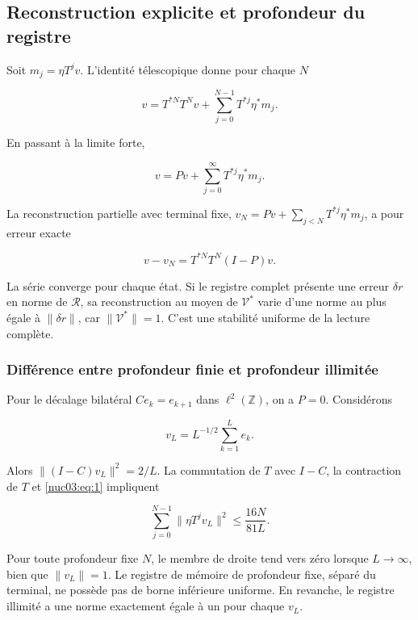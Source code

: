 \subsection{Reconstruction explicite et profondeur du registre}

Soit \(m_j=\eta T^jv\). L’identité télescopique donne pour chaque \(N\)

\begin{equation}
\boxed{v=T^{*N}T^Nv+\sum_{j=0}^{N-1}T^{*j}\eta^*m_j.}
\label{nuc03:eq:8}
\end{equation}

En passant à la limite forte,

\begin{equation}
\boxed{v=Pv+\sum_{j=0}^{\infty}T^{*j}\eta^*m_j.}
\label{nuc03:eq:9}
\end{equation}

La reconstruction partielle avec terminal fixe,
\(v_N=Pv+\sum_{j<N}T^{*j}\eta^*m_j\), a pour erreur exacte

\begin{equation}
v-v_N=T^{*N}T^N(I-P)v.
\label{nuc03:eq:10}
\end{equation}

La série converge pour chaque état. Si le registre complet présente une erreur \(\delta r\) en norme de \(\mathcal R\), sa reconstruction au moyen de \(\mathcal V^*\) varie d’une norme au plus égale à \(\|\delta r\|\), car \(\|\mathcal V^*\|=1\). C’est une stabilité uniforme de la lecture complète.

\subsubsection{Différence entre profondeur finie et profondeur illimitée}

Pour le décalage bilatéral \(Ce_k=e_{k+1}\) dans \(\ell^2(\mathbb Z)\), on a \(P=0\). Considérons


\[
v_L=L^{-1/2}\sum_{k=1}^{L}e_k.
\]

Alors \(\|(I-C)v_L\|^2=2/L\). La commutation de \(T\) avec \(I-C\), la contraction de \(T\) et \eqref{nuc03:eq:1} impliquent

\begin{equation}
\sum_{j=0}^{N-1}\|\eta T^jv_L\|^2
\leq\frac{16N}{81L}.
\label{nuc03:eq:11}
\end{equation}

Pour toute profondeur fixe \(N\), le membre de droite tend vers zéro lorsque \(L\to\infty\), bien que \(\|v_L\|=1\). Le registre de mémoire de profondeur fixe, séparé du terminal, ne possède pas de borne inférieure uniforme. En revanche, le registre illimité a une norme exactement égale à un pour chaque \(v_L\).


